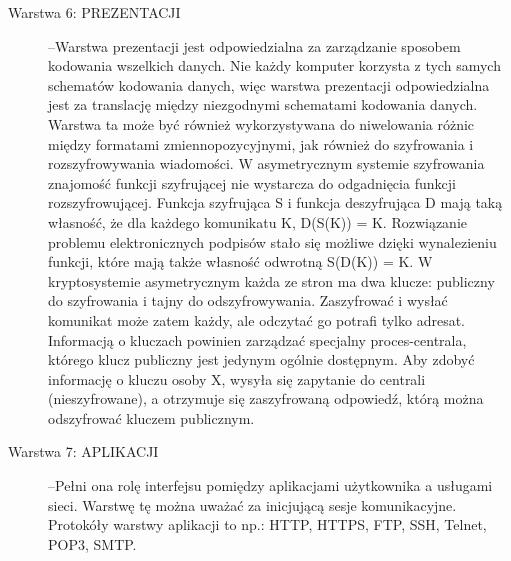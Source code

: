 \documentclass[a4paper,11pt]{article}
\begin{document}
\begin {description}
\item[Warstwa 6: PREZENTACJI]--Warstwa prezentacji jest odpowiedzialna za zarządzanie sposobem kodowania wszelkich danych. Nie każdy komputer korzysta z tych samych schematów kodowania danych, więc warstwa prezentacji odpowiedzialna jest za translację między niezgodnymi schematami kodowania danych. Warstwa ta może być również wykorzystywana do niwelowania różnic między formatami zmiennopozycyjnymi, jak również do szyfrowania i rozszyfrowywania wiadomości.  W asymetrycznym systemie szyfrowania znajomość funkcji szyfrującej nie wystarcza do odgadnięcia funkcji rozszyfrowującej. Funkcja szyfrująca S i funkcja deszyfrująca D mają taką własność, że dla każdego komunikatu K, D(S(K)) = K. Rozwiązanie problemu elektronicznych podpisów stało się możliwe dzięki wynalezieniu funkcji, które mają także własność odwrotną S(D(K)) = K. W kryptosystemie asymetrycznym każda ze stron ma dwa klucze: publiczny do szyfrowania i tajny do odszyfrowywania. Zaszyfrować i wysłać komunikat może zatem każdy, ale odczytać go potrafi tylko adresat. Informacją o kluczach powinien zarządzać specjalny proces-centrala, którego klucz publiczny jest jedynym ogólnie dostępnym. Aby zdobyć informację o kluczu osoby X, wysyła się zapytanie do centrali (nieszyfrowane), a otrzymuje się zaszyfrowaną odpowiedź, którą można odszyfrować kluczem publicznym. 
 
\item[Warstwa 7: APLIKACJI]--Pełni ona rolę interfejsu pomiędzy aplikacjami użytkownika a usługami sieci. Warstwę tę można uważać za inicjującą sesje komunikacyjne. Protokóły warstwy aplikacji to np.: HTTP, HTTPS, FTP, SSH, Telnet, POP3, SMTP. 
\end{description}
\end{document}
